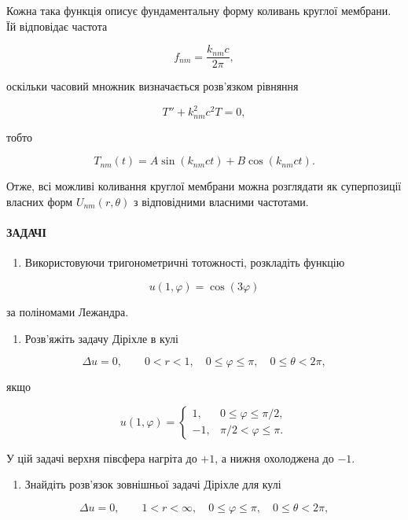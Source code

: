 \documentclass[
  ukrainian,
]{article}
\providecommand{\tightlist}{%
  \setlength{\itemsep}{0pt}\setlength{\parskip}{0pt}}
\begin{document}
Кожна така функція описує фундаментальну форму коливань круглої
мембрани. Їй відповідає частота

\[f_{nm}=\frac{k_{nm}c}{2\pi},\]

оскільки часовий множник визначається розв'язком рівняння

\[T'' + k_{nm}^{2}c^{2}T = 0,\]

тобто

\[T_{nm}(t)=A\sin(k_{nm}ct)+B\cos(k_{nm}ct).\]

Отже, всі можливі коливання круглої мембрани можна розглядати як
суперпозиції власних форм \(U_{nm}(r,\theta)\) з відповідними власними
частотами.

\paragraph{ЗАДАЧІ}\label{ux437ux430ux434ux430ux447ux456-1}

\begin{enumerate}
\def\labelenumi{\arabic{enumi}.}
\tightlist
\item
  Використовуючи тригонометричні тотожності, розкладіть функцію
\end{enumerate}

\[u(1,\varphi)=\cos(3\varphi)\]

за поліномами Лежандра.

\begin{enumerate}
\def\labelenumi{\arabic{enumi}.}
\setcounter{enumi}{1}
\tightlist
\item
  Розв'яжіть задачу Діріхле в кулі
\end{enumerate}

\[\Delta u = 0, \qquad 0 < r < 1,\quad 0 \le \varphi \le \pi,\quad 0 \le \theta < 2\pi,\]

якщо

\[u(1,\varphi)=\begin{cases}1, & 0 \le \varphi \le \pi/2,\\-1, & \pi/2 < \varphi \le \pi.\end{cases}\]

У цій задачі верхня півсфера нагріта до \(+1\), а нижня охолоджена до
\(-1\).

\begin{enumerate}
\def\labelenumi{\arabic{enumi}.}
\setcounter{enumi}{2}
\tightlist
\item
  Знайдіть розв'язок зовнішньої задачі Діріхле для кулі
\end{enumerate}

\[\Delta u = 0, \qquad 1 < r < \infty,\quad 0 \le \varphi \le \pi,\quad 0 \le \theta < 2\pi,\]
\end{document}
